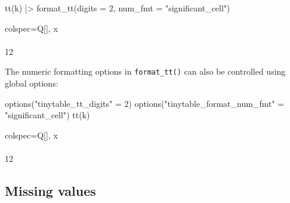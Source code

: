 \documentclass[
  letterpaper,
  DIV=11,
  numbers=noendperiod]{scrartcl}
\newenvironment{Shaded}{\begin{snugshade}}{\end{snugshade}}
\newcommand{\AttributeTok}[1]{\textcolor[rgb]{0.40,0.45,0.13}{#1}}
\newcommand{\DecValTok}[1]{\textcolor[rgb]{0.68,0.00,0.00}{#1}}
\newcommand{\FunctionTok}[1]{\textcolor[rgb]{0.28,0.35,0.67}{#1}}
\newcommand{\NormalTok}[1]{\textcolor[rgb]{0.00,0.23,0.31}{#1}}
\newcommand{\OtherTok}[1]{\textcolor[rgb]{0.00,0.23,0.31}{#1}}
\newcommand{\SpecialCharTok}[1]{\textcolor[rgb]{0.37,0.37,0.37}{#1}}
\newcommand{\StringTok}[1]{\textcolor[rgb]{0.13,0.47,0.30}{#1}}
\begin{document}
\begin{Shaded}
\begin{Highlighting}[]
\FunctionTok{tt}\NormalTok{(k) }\SpecialCharTok{|\textgreater{}} \FunctionTok{format\_tt}\NormalTok{(}\AttributeTok{digits =} \DecValTok{2}\NormalTok{, }\AttributeTok{num\_fmt =} \StringTok{"significant\_cell"}\NormalTok{)}
\end{Highlighting}
\end{Shaded}

\begin{table}[H]
\centering
\begin{tblr}[         %
]                     %
{                     %
colspec={Q[]},
}                     %
\toprule
x \\  \\
12 \\
\bottomrule
\end{tblr}
\end{table}

The numeric formatting options in \texttt{format\_tt()} can also be
controlled using global options:

\begin{Shaded}
\begin{Highlighting}[]
\FunctionTok{options}\NormalTok{(}\StringTok{"tinytable\_tt\_digits"} \OtherTok{=} \DecValTok{2}\NormalTok{)}
\FunctionTok{options}\NormalTok{(}\StringTok{"tinytable\_format\_num\_fmt"} \OtherTok{=} \StringTok{"significant\_cell"}\NormalTok{)}
\FunctionTok{tt}\NormalTok{(k)}
\end{Highlighting}
\end{Shaded}

\begin{table}[H]
\centering
\begin{tblr}[         %
]                     %
{                     %
colspec={Q[]},
}                     %
\toprule
x \\  \\
12      \\
\bottomrule
\end{tblr}
\end{table}

\subsection{Missing values}\label{missing-values}
\end{document}
